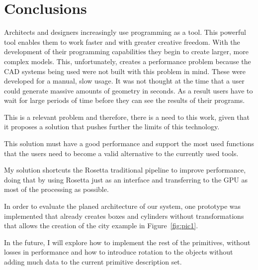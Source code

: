 
% 
% 

\section{Conclusions}
\label{sec:conclusions}

Architects and designers increasingly use programming as a tool. This powerful tool enables them to work faster and with greater creative freedom. With the development of their programming capabilities they begin to create larger, more complex models. This, unfortunately, creates a performance problem because the CAD systems being used were not built with this problem in mind. These were developed for a manual, slow usage. It was not thought at the time that a user could generate massive amounts of geometry in seconds. As a result users have to wait for large periods of time before they can see the results of their programs.

This is a relevant problem and therefore, there is a need to this work, given that it proposes a solution that pushes further the limits of this technology.

This solution must have a good performance and support the most used functions that the users need to become a valid alternative to the currently used tools.

My solution shortcuts the Rosetta traditional pipeline to improve performance, doing that by using Rosetta just as an interface and transferring to the GPU as most of the processing as possible.

In order to evaluate the planed architecture of our system, one prototype was implemented that already creates boxes and cylinders without transformations that allows the creation of the city example in Figure~\ref{fig:pic1}.

In the future, I will explore how to implement the rest of the primitives, without losses in performance and how to introduce rotation to the objects without adding much data to the current primitive description set.